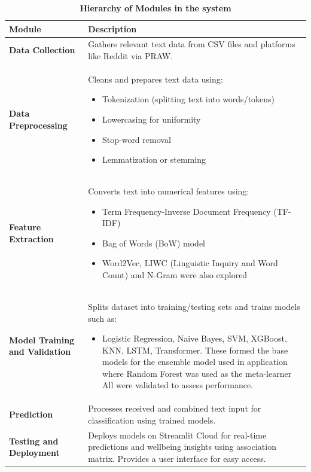 \begin{table}[H]
    \centering
    \renewcommand{\arraystretch}{1.2} %
    \small %
    \begin{tabularx}{\textwidth}{|p{3.5cm}|X|}
        \hline
        \textbf{Module} & \textbf{Description} \\
        \hline
        \textbf{Data Collection} & Gathers relevant text data from CSV files and platforms like Reddit via PRAW. \\
        \hline
        \textbf{Data Preprocessing} & Cleans and prepares text data using:
        \begin{itemize}
            \setlength{\itemsep}{0pt}  %
            \setlength{\parskip}{0pt}
            \item Tokenization (splitting text into words/tokens)
            \item Lowercasing for uniformity
            \item Stop-word removal
            \item Lemmatization or stemming
        \end{itemize} \\
        \hline
        \textbf{Feature Extraction} & Converts text into numerical features using:
        \begin{itemize}
            \setlength{\itemsep}{0pt}  %
            \setlength{\parskip}{0pt}
            \item Term Frequency-Inverse Document Frequency (TF-IDF)
            \item Bag of Words (BoW) model
            \item Word2Vec, LIWC (Linguistic Inquiry and Word Count) and N-Gram were also explored
        \end{itemize} \\
        \hline
        \textbf{Model Training and Validation} & Splits dataset into training/testing sets and trains models such as:
        \setlength{\itemsep}{0pt}  %
        \setlength{\parskip}{0pt}
        \begin{itemize}
            \item Logistic Regression, Naive Bayes, SVM, XGBoost, KNN, LSTM, Transformer. These formed the base models for the ensemble model used in application where Random Forest was used as the meta-learner All were validated to assess performance.
        \end{itemize} \\
        \hline
        \textbf{Prediction} & Processes received and combined text input for classification using trained models. \\
        \hline
        \textbf{Testing and Deployment} & Deploys models on Streamlit Cloud for real-time predictions and wellbeing insights using association matrix. Provides a user interface for easy access. \\
        \hline
    \end{tabularx}
    \caption*{\textbf{Hierarchy of Modules in the system}}
    \label{tab:modules_hierarchy}
\end{table}


